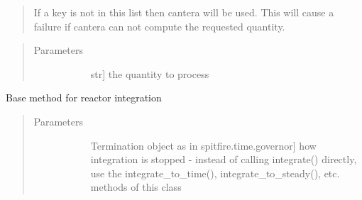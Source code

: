 \documentclass[letterpaper,10pt,english]{sphinxmanual}
\begin{document}
\begin{fulllineitems}
\begin{fulllineitems}
\begin{quote}
If a key is not in this list then cantera will be used.
This will cause a failure if cantera can not compute the requested quantity.
\end{quote}
\begin{quote}\begin{description}
\item[{Parameters}] \leavevmode\begin{description}
\item[{}] \leavevmode{[}str{]}
the quantity to process

\end{description}

\end{description}\end{quote}

\end{fulllineitems}


\begin{fulllineitems}
\label{\detokenize{spitfire.chemistry.reactors:spitfire.chemistry.reactors.HomogeneousReactor.integrate}}
Base method for reactor integration
\begin{quote}\begin{description}
\item[{Parameters}] \leavevmode\begin{description}
\item[{}] \leavevmode{[}Termination object as in spitfire.time.governor{]}
how integration is stopped - instead of calling integrate() directly, use the integrate\_to\_time(), integrate\_to\_steady(), etc. methods of this class


\end{description}
\end{description}
\end{quote}
\end{fulllineitems}
\end{fulllineitems}
\end{document}
